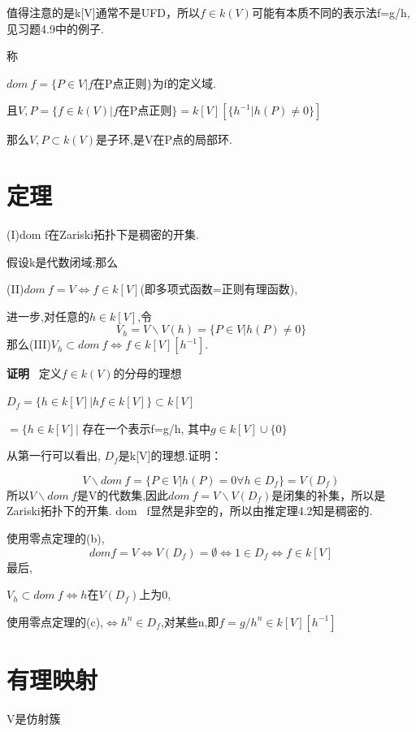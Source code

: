 \documentclass[UTF8]{book}
\begin{document}
值得注意的是k[V]通常不是UFD，所以$f\in k(V)$可能有本质不同的表示法f=g/h, 见习题4.9中的例子.

称

\center  $dom \ f=\{P\in V\vert f$在P点正则$\}$为f的定义域.

                且$V,P=\{f\in k(V) \vert f$在P点正则$\}=k[V][\{h^{-1}\vert h(P)\neq 0\}]$

\justifying
那么$V,P\subset k(V)$是子环,是V在P点的局部环.
\section{定理}
(I)dom f在Zariski拓扑下是稠密的开集.

假设k是代数闭域;那么

(II)$dom \ f=V\iff f\in k[V]$(即多项式函数=正则有理函数),

进一步,对任意的$h\in k[V]$,令
\begin{equation*}
V_{h}=V\backslash V(h)=\{P\in V \vert h(P)\neq 0\}
\end{equation*}
那么(III)$V_{h}\subset dom \ f \iff f\in k[V][h^{-1}]$.

\textbf{证明} \ 定义$f\in k(V)$的分母的理想

\center $ D_{f}=\{ h\in k[V] \vert hf\in k[V] \}\subset k[V]$




      $ =\{ h\in k[V] \vert$ 存在一个表示f=g/h, 其中$g\in k[V]\cup \{0\}$

\justifying

从第一行可以看出, $D_{f}$是k[V]的理想.证明：

\begin{equation*}
V\backslash dom \ f=\{P\in V \vert h(P)= 0 \forall h\in D_{f}\}=V(D_{f})
\end{equation*}
所以$V\backslash dom \ f$是V的代数集,因此$dom \ f=V\backslash V(D_{f})$是闭集的补集，所以是Zariski拓扑下的开集. dom \ f显然是非空的，所以由推定理4.2知是稠密的.

使用零点定理的(b),
\begin{equation*}
dom f=V\iff V(D_{f})=\emptyset \iff 1\in D_{f} \iff f\in k[V]
\end{equation*}
最后,

$V_{h}\subset dom \ f \iff h $在$V(D_{f})$上为0,

使用零点定理的(c),$\iff h^{n}\in D_{f}$,对某些n,即$f=g/h^{n}\in k[V][h^{-1}]$

\section{有理映射}V是仿射簇
\end{document}
